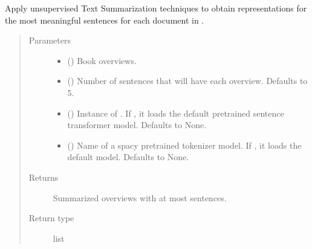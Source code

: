 \documentclass[letterpaper,10pt,english]{sphinxmanual}
\begin{document}
\begin{fulllineitems}
\label{\detokenize{code:code_utils.utils.summarize_corpus_overviews}}
Apply unsupervised Text Summarization techniques to obtain representations for
the most meaningful sentences for each document in .
\begin{quote}\begin{description}
\item[{Parameters}] \leavevmode\begin{itemize}
\item {} 
 () \textendash{} Book overviews.

\item {} 
 (\sphinxstyleliteralemphasis{\sphinxupquote{, }}) \textendash{} Number of sentences that will have each overview. Defaults to 5.

\item {} 
 (\sphinxstyleliteralemphasis{\sphinxupquote{, }}) \textendash{} Instance of . If , it loads the default
pretrained sentence transformer model. Defaults to None.

\item {} 
 (\sphinxstyleliteralemphasis{\sphinxupquote{, }}) \textendash{} Name of a spacy pretrained tokenizer model. If , it
loads the default model. Defaults to None.

\end{itemize}

\item[{Returns}] \leavevmode
Summarized overviews with at most  sentences.

\item[{Return type}] \leavevmode
list

\end{description}\end{quote}

\end{fulllineitems}
\end{document}

